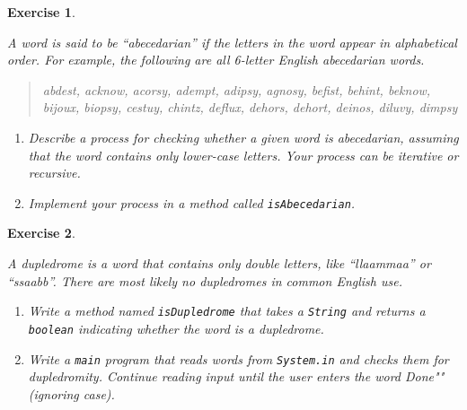 \documentclass[12pt]{book}
\theoremstyle{exercise}
\newtheorem{exercise}{Exercise}[chapter]
\newcommand{\java}[1]{\verb"#1"}
\newcommand{\java}[1]{\lstinline{#1}} %
\begin{document}
\begin{exercise}
\label{abecedarian}

A word is said to be ``abecedarian'' if the letters in the word appear in alphabetical order.
For example, the following are all 6-letter English abecedarian words.

\begin{quote}
abdest, acknow, acorsy, adempt, adipsy, agnosy, befist, behint, %
beknow, bijoux, biopsy, cestuy, chintz, deflux, dehors, dehort, %
deinos, diluvy, dimpsy %
\end{quote}

\begin{enumerate}

\item Describe a process for checking whether a given word is abecedarian, assuming that the word contains only lower-case letters.
Your process can be iterative or recursive.

\item Implement your process in a method called \java{isAbecedarian}.

\end{enumerate}

\end{exercise}


\begin{exercise}
\label{dupledrome}

A dupledrome is a word that contains only double letters, like ``llaammaa'' or ``ssaabb''.
There are most likely no dupledromes in common English use.

\begin{enumerate}

\item Write a method named \java{isDupledrome} that takes a \java{String} and returns a \java{boolean} indicating whether the word is a dupledrome.

\item Write a \java{main} program that reads words from \java{System.in} and checks them for dupledromity.
Continue reading input until the user enters the word \java{"Done"} (ignoring case).

\end{enumerate}

\end{exercise}
\end{document}
